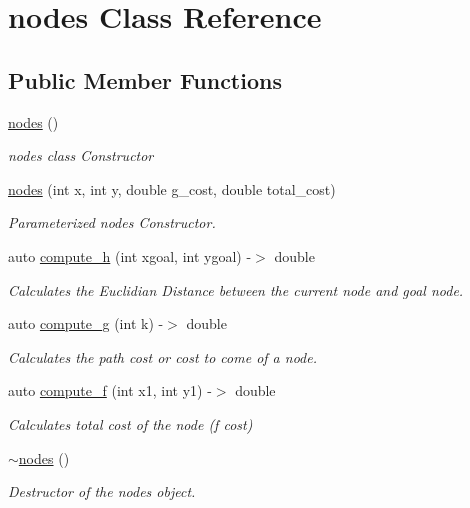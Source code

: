 \hypertarget{classnodes}{}\section{nodes Class Reference}
\label{classnodes}
\subsection*{Public Member Functions}
\begin{DoxyCompactItemize}
\item 
\hyperlink{classnodes_a3988ea9ac6183274db3f650401679c43}{nodes} ()
\begin{DoxyCompactList}\small\item\em nodes class Constructor \end{DoxyCompactList}\item 
\hyperlink{classnodes_a9d918b5b9246a8446e4c436d1c480303}{nodes} (int x, int y, double g\+\_\+cost, double total\+\_\+cost)
\begin{DoxyCompactList}\small\item\em Parameterized nodes Constructor. \end{DoxyCompactList}\item 
auto \hyperlink{classnodes_a29abcbaca8c8067183c31e4a44a4ff5d}{compute\+\_\+h} (int xgoal, int ygoal) -\/$>$ double
\begin{DoxyCompactList}\small\item\em Calculates the Euclidian Distance between the current node and goal node. \end{DoxyCompactList}\item 
auto \hyperlink{classnodes_a316416838883df193808d775003aa5d6}{compute\+\_\+g} (int k) -\/$>$ double
\begin{DoxyCompactList}\small\item\em Calculates the path cost or cost to come of a node. \end{DoxyCompactList}\item 
auto \hyperlink{classnodes_a1e13e45bda8fc385da757d3c58c7be18}{compute\+\_\+f} (int x1, int y1) -\/$>$ double
\begin{DoxyCompactList}\small\item\em Calculates total cost of the node (f cost) \end{DoxyCompactList}\item 
\hyperlink{classnodes_a2f04514e7bf728b151f09c730c1ffe99}{$\sim$nodes} ()\hypertarget{classnodes_a2f04514e7bf728b151f09c730c1ffe99}{}\label{classnodes_a2f04514e7bf728b151f09c730c1ffe99}

\begin{DoxyCompactList}\small\item\em Destructor of the nodes object. \end{DoxyCompactList}\end{DoxyCompactItemize}
